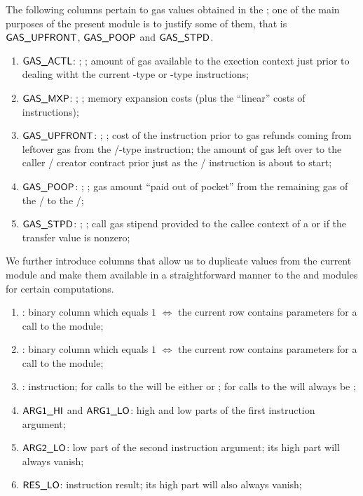 The following columns pertain to gas values obtained in the \hubMod{};
one of the main purposes of the present module is to justify some of them, that is
$\textsf{GAS}\textsf{\_UPFRONT}$, $\textsf{GAS}\textsf{\_POOP}$ and $\textsf{GAS}\textsf{\_STPD}$.
\begin{enumerate}[resume]
	\item $\textsf{GAS}\textsf{\_ACTL}$: \godGiven{};
		\ccc{}; amount of gas available to the exection context just prior to dealing witht the current -type or -type instructions;
	\item $\textsf{GAS}\textsf{\_MXP}$: \godGiven{};
		\ccc{}; memory expansion costs (plus the ``linear'' costs of  instructions);
	\item $\textsf{GAS}\textsf{\_UPFRONT}$: \godGiven{};
		\ccc{}; cost of the instruction prior to gas refunds coming from leftover gas from the /-type instruction;
		the amount of gas left over to the caller / creator contract prior just as the / instruction is about to start; 
	\item $\textsf{GAS}\textsf{\_POOP}$: \godGiven{};
		\ccc{}; gas amount ``paid out of pocket'' from the remaining gas of the \callerr{}/\creator{} to the \calleee{}/\createe{};	
	\item $\textsf{GAS}\textsf{\_STPD}$: \godGiven{};
		\ccc{}; call gas stipend provided to the callee context of a  or  if the transfer value is nonzero; 
\end{enumerate}
We further introduce columns that allow us to duplicate values from the current module and make them available in a straightforward manner to the \wcpMod{} and \modMod{} modules for certain computations.
\begin{enumerate}[resume]
	\item \wcpLookupFlag{}:
		binary column which equals $1$ $\iff$ the current row contains parameters for a call to the \wcpMod{} module;
	\item \divLookupFlag{}:
		binary column which equals $1$ $\iff$ the current row contains parameters for a call to the \modMod{} module;
	\item \exoInst{}:
		instruction; for calls to the \wcpMod{} will be either  or ; for calls to the \modMod{} will always be ;
	\item $\textsf{ARG}\textsf{1}\textsf{\_HI}{}$ and $\textsf{ARG}\textsf{1}\textsf{\_LO}{}$:
		high and low parts of the first instruction argument;
	\item $\textsf{ARG}\textsf{2}\textsf{\_LO}{}$:
		low part of the second instruction argument; its high part will always vanish;
	\item $\textsf{RES}\textsf{\_LO}{}$:
		instruction result; its high part will also always vanish; 
\end{enumerate}
